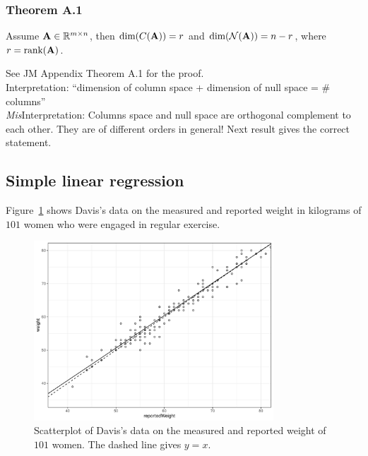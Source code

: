 \subsubsection*{Theorem A.1}
Assume $\mathbf{A} \in \mathbb{R}^{m \times n}$, then $\mbox{dim}(\mathnormal{C}(\mathbf{A})) = r$ and $\mbox{dim}(\mathcal{N}(\mathbf{A})) = n - r$, where $r = \mbox{rank}(\mathbf{A})$.

See JM Appendix Theorem A.1 for the proof.\\
Interpretation: ``dimension of column space + dimension of null space = \# columns''\\
{\it Mis}Interpretation: Columns space and null space are orthogonal complement to each other. They are of different orders in general! Next result gives the correct statement.

\newpage

\subsection*{Simple linear regression}

Figure~\ref{fig:weights} shows Davis's data on the measured and reported weight in kilograms of $101$ women who were engaged in regular exercise.
\begin{figure}[H]
\begin{center}
  \includegraphics[width=0.8\textwidth]{Lecture3/figure_5_1.pdf}
  \caption{Scatterplot of Davis's data on the measured and reported weight of $101$ women.  The dashed line gives $y = x$.}
  \label{fig:weights}
\end{center}
\end{figure}

